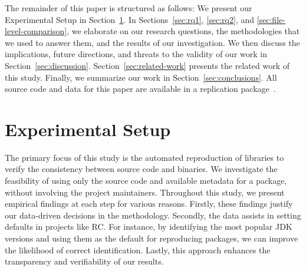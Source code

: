 \documentclass[smallextended]{svjour3}
\newcommand{\secref}[1]{Section~\ref{sec:#1}}
\newcommand{\maven}[1]{\tool{Maven{#1}}}
\begin{document}
\smallskip


The remainder of this paper is structured as follows: We present our Experimental Setup in \secref{methodology}. In 
Sections~\ref{sec:rq1}, \ref{sec:rq2}, and \ref{sec:file-level-comparison}, we elaborate on our research questions, the methodologies that we used to answer them, and the results of our investigation. We then discuss the implications, future directions, and threats to the validity of our work in \secref{discussion}. \secref{related-work} presents the related work of this study. Finally, we summarize our work in \secref{conclusions}. All source code and data for this paper are available in a replication package~\cite{repPackage}. 


\section{Experimental Setup}
\label{sec:methodology}

The primary focus of this study is the automated reproduction of \maven{} libraries to verify the consistency between source code and binaries. We investigate the feasibility of using only the source code and available metadata for a \maven{} package, without involving the project maintainers.
Throughout this study, we present empirical findings at each step for various reasons. Firstly, these findings justify our data-driven decisions in the methodology. Secondly, the data assists in setting defaults in projects like RC. For instance, by identifying the most popular JDK versions and using them as the default for reproducing packages, we can improve the likelihood of correct identification. Lastly, this approach enhances the transparency and verifiability of our results.
\end{document}
